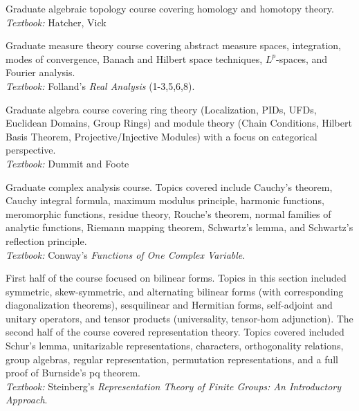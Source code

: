 \documentclass[11pt,letterpaper,sans]{moderncv}
\begin{document}
%
  {Graduate algebraic topology course covering homology and homotopy theory.  \\ \emph{Textbook: }Hatcher, Vick}

%
  {Graduate measure theory course covering abstract measure spaces, integration, modes of convergence, Banach and Hilbert space techniques, $L^p$-spaces, and Fourier analysis. \\ \emph{Textbook: }Folland's \emph{Real Analysis} (1-3,5,6,8).}

%
  {Graduate algebra course covering ring theory (Localization, PIDs, UFDs, Euclidean Domains, Group Rings) and module theory (Chain Conditions, Hilbert Basis Theorem, Projective/Injective Modules) with a focus on categorical perspective.   \\ \emph{Textbook: }Dummit and Foote}

%
  {Graduate complex analysis course. Topics covered include Cauchy’s theorem, Cauchy integral formula, maximum modulus principle, harmonic functions, meromorphic functions, residue theory, Rouche's theorem, normal families of analytic functions, Riemann mapping theorem, Schwartz's lemma, and Schwartz's reflection principle. \\ \emph{Textbook: }Conway's \emph{Functions of One Complex Variable}.}

%
  {First half of the course focused on bilinear forms. Topics in this section included symmetric, skew-symmetric, and alternating bilinear forms (with corresponding diagonalization theorems), sesquilinear and Hermitian forms, self-adjoint and unitary operators, and tensor products (universality, tensor-hom adjunction). The second half of the course covered representation theory. Topics covered included Schur's lemma, unitarizable representations, characters, orthogonality relations, group algebras, regular representation, permutation representations, and a full proof of Burnside's pq theorem. \\ \emph{Textbook: }Steinberg's \emph{Representation Theory of Finite Groups: An Introductory Approach}.}

\vspace{2cm}
\end{document}
